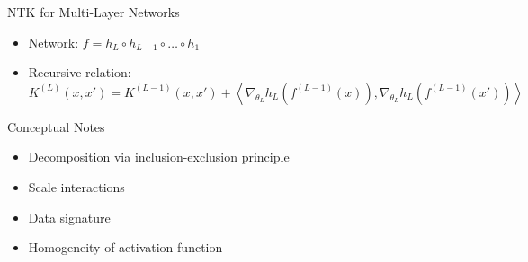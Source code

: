 \documentclass{beamer}
\begin{document}
\begin{frame}{NTK for Multi-Layer Networks}
\begin{itemize}
\item Network: $f = h_L \circ h_{L-1} \circ \dots \circ h_1$
\item Recursive relation:
\begin{equation}
K^{(L)}(x,x') = K^{(L-1)}(x,x') + \left\langle \nabla_{\theta_L} h_L(f^{(L-1)}(x)), \nabla_{\theta_L} h_L(f^{(L-1)}(x')) \right\rangle
\end{equation}
\end{itemize}
\end{frame}

\begin{frame}{Conceptual Notes}
\begin{itemize}
\item Decomposition via inclusion-exclusion principle
\item Scale interactions
\item Data signature
\item Homogeneity of activation function
\end{itemize}
\end{frame}
\end{document}
